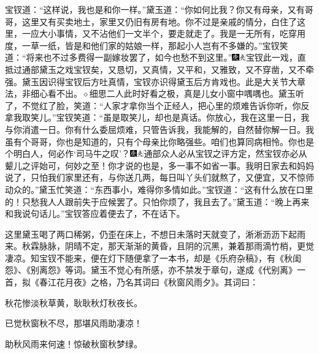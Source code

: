 宝钗道：“这样说，我也是和你一样。”黛玉道：“你如何比我？你又有母亲，又有哥哥，这里又有买卖地土，家里又仍旧有房有地。你不过是亲戚的情分，白住了这里，一应大小事情，又不沾他们一文半个，要走就走了。我是一无所有，吃穿用度，一草一纸，皆是和他们家的姑娘一样，那起小人岂有不多嫌的。”宝钗笑道：“将来也不过多费得一副嫁妆罢了，如今也愁不到这里。”{\includegraphics[width=3mm]{../Images/00004}\includegraphics[width=3mm]{../Images/00012}\footnotesize \kaishu 宝钗此一戏，直抵过通部黛玉之戏宝钗矣，又恳切，又真情，又平和，又雅致，又不穿凿，又不牵强。黛玉因识得宝钗后方吐真情，宝钗亦识得黛玉后方肯戏也。此是大关节大章法，非细心看不出。{$\diamond$}细思二人此时好看之极，真是儿女小窗中喁喁也。}黛玉听了，不觉红了脸，笑道：“人家才拿你当个正经人，把心里的烦难告诉你听，你反拿我取笑儿。”宝钗笑道：“虽是取笑儿，却也是真话。你放心，我在这里一日，我与你消遣一日。你有什么委屈烦难，只管告诉我，我能解的，自然替你解一日。我虽有个哥哥，你也是知道的，只有个母亲比你略强些。咱们也算同病相怜。你也是个明白人，何必作‘司马牛之叹’？{\includegraphics[width=3mm]{../Images/00004}\includegraphics[width=3mm]{../Images/00012}\footnotesize \kaishu 通部众人必从宝钗之评方定，然宝钗亦必从颦儿之评始可，何妙之至！}你才说的也是，多一事不如省一事。我明日家去和妈妈说了，只怕我们家里还有，与你送几两，每日叫丫头们就熬了，又便宜，又不惊师动众的。”黛玉忙笑道：“东西事小，难得你多情如此。”宝钗道：“这有什么放在口里的！只愁我人人跟前失于应候罢了。只怕你烦了，我且去了。”黛玉道：“晚上再来和我说句话儿。”宝钗答应着便去了，不在话下。

这里黛玉喝了两口稀粥，仍歪在床上，不想日未落时天就变了，淅淅沥沥下起雨来。秋霖脉脉，阴晴不定，那天渐渐的黄昏，且阴的沉黑，兼着那雨滴竹梢，更觉凄凉。知宝钗不能来，便在灯下随便拿了一本书，却是《乐府杂稿》，有《秋闺怨》、《别离怨》等词。黛玉不觉心有所感，亦不禁发于章句，遂成《代别离》一首，拟《春江花月夜》之格，乃名其词曰《秋窗风雨夕》。其词曰：

秋花惨淡秋草黄，耿耿秋灯秋夜长。

已觉秋窗秋不尽，那堪风雨助凄凉！

助秋风雨来何速！惊破秋窗秋梦绿。

